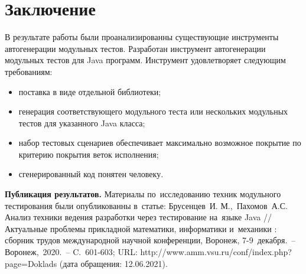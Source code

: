 \chapter*{Заключение}                       %

\hspace*{2.5em}В результате работы были проанализированны существующие инструменты автогенерации модульных тестов. Разработан инструмент автогенерации модульных тестов для Java программ. Инструмент удовлетворяет следующим требованиям:

\begin{itemize}
	\item поставка в виде отдельной библиотеки;
	\item генерация соответствующего модульного теста или нескольких модульных тестов для указанного Java класса;
	\item набор тестовых сценариев обеспечивает максимально возможное покрытие по критерию покрытия веток исполнения;
	\item сгенерированный код понятен человеку.
\end{itemize}


\textbf{Публикация результатов.} Материалы по~исследованию техник модульного тестирования были опубликованны в~статье:  Брусенцев~И. М.,~Пахомов~А.С.  Анализ техники ведения разработки через тестирование на~языке Java // Актуальные проблемы прикладной математики, информатики и~механики : сборник трудов международной научной конференции, Воронеж, 7-9~декабря.~-- Воронеж,~2020.~-- C.~601-603; URL: http://www.amm.vsu.ru/conf/index.php?page=Doklads (дата обращения: 12.06.2021).
